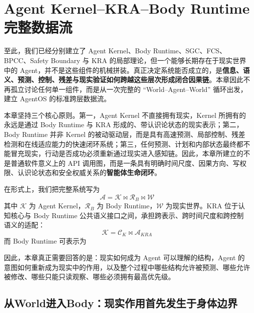 \chapter{Agent Kernel--KRA--Body Runtime完整数据流}
\label{chap:kernel-kra-bodyruntime-dataflow}

\begin{chapterlead}
至此，我们已经分别建立了 Agent Kernel、Body Runtime、SGC、FCS、BPCC、Safety Boundary 与 KRA 的局部理论，但一个能够长期存在于现实世界中的 Agent，并不是这些组件的机械拼装。真正决定系统能否成立的，是\textbf{信息、语义、预测、控制、残差与现实验证如何跨越这些层次形成闭合因果链}。本章因此不再孤立讨论任何单一组件，而是从一次完整的 ``World--Agent--World'' 循环出发，建立 AgentOS 的标准跨层数据流。

本章坚持三个核心原则。第一，Agent Kernel 不直接拥有现实，Kernel 所拥有的永远是通过 Body Runtime 与 KRA 形成的、带认识论状态的现实表示；第二，Body Runtime 并非 Kernel 的被动驱动层，而是具有高速预测、局部控制、残差检测和在线适应能力的快速闭环系统；第三，任何预测、计划和内部状态最终都不能冒充现实，行动是否成功必须重新通过现实进入感知链。因此，本章所建立的不是普通软件意义上的 API 调用图，而是一条具有明确时间尺度、因果方向、写权限、认识论状态和安全权威关系的\textbf{智能体生命闭环}。

在形式上，我们把完整系统写为
\[
\boxed{
\mathcal A
=
\mathcal K
\bowtie
\mathcal R_B
\bowtie
\mathcal W
}
\]
其中 $\mathcal K$ 为 Agent Kernel，$\mathcal R_B$ 为 Body Runtime，$\mathcal W$ 为现实世界。KRA 位于认知核心与 Body Runtime 公共语义接口之间，承担跨表示、跨时间尺度和跨控制语义的适配：
\[
\boxed{
\mathcal K
=
\mathcal C_K
\bowtie
\mathcal A_{KRA}
}
\]
而 Body Runtime 可表示为
\begin{statementbox}
\centering
{}
\end{statementbox}
因此，本章真正需要回答的是：现实如何成为 Agent 可以理解的结构，Agent 的意图如何重新成为现实中的作用，以及整个过程中哪些结构允许被预测、哪些允许被修改、哪些只能只读观察、哪些必须拥有最高优先级。
\end{chapterlead}


\section{从World进入Body：现实作用首先发生于身体边界}

